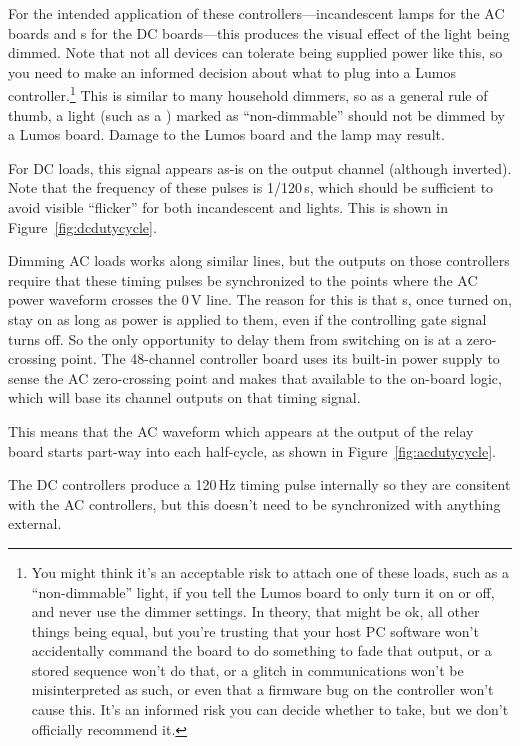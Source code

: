 \documentclass[letterpaper,twoside,onecolumn,openright,final]{memoir}
\begin{document}
For the intended application of these controllers---incandescent lamps for the AC
boards and s for the DC boards---this produces the visual effect of the light
being dimmed.  Note that not all devices can tolerate being supplied power like this,
so you need to make an informed decision about what to plug into a Lumos 
controller.\footnote{You might think it's an acceptable risk to attach one of these loads, such as a
``non-dimmable''  light, if you tell the Lumos board to only turn it on
or off, and never use the dimmer settings.  In theory, that might be ok, all other things
being equal, but you're trusting that your host PC software won't accidentally command
the board to do something to fade that output, or a stored sequence won't do that,
or a glitch in communications won't be misinterpreted as such, or even that a firmware
bug on the controller won't cause this. It's an informed risk you can decide whether to take, but
we don't officially recommend it.} This is similar to many household dimmers, so as a general
rule of thumb, a light (such as a ) marked as ``non-dimmable'' should not
be dimmed by a Lumos board.  Damage to the Lumos board and the lamp may result.

For DC loads, this  signal appears as-is on the output channel (although
inverted).  Note that the frequency of these pulses is 1/120\,s, which should be
sufficient to avoid visible ``flicker'' for both incandescent and  lights.
This is shown in Figure~\ref{fig:dcdutycycle}.


Dimming AC loads works along similar lines, but the  outputs on those
controllers require that these timing pulses be synchronized to the points where the AC
power waveform crosses the 0\,V line.  The reason for this is that s, once
turned on, stay on as long as power is applied to them, even if the controlling gate signal
turns off.  So the only opportunity to delay them from switching on is at a zero-crossing
point.  The 48-channel controller board uses its built-in power supply to sense the
AC zero-crossing point and makes that available to the on-board logic, which will base its channel outputs
on that timing signal.

This means that the AC waveform which appears at the output of the relay board starts part-way
into each half-cycle, as shown in Figure~\ref{fig:acdutycycle}.


The DC controllers produce a 120\,Hz timing pulse internally so they are consitent with the
AC controllers, but this doesn't need to be synchronized with anything external.
\end{document}
